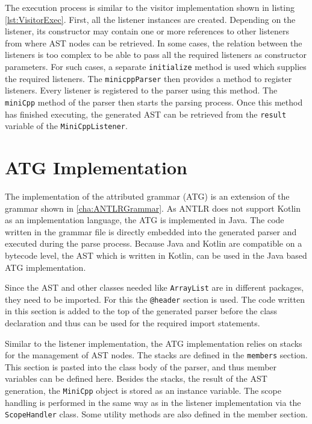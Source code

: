 The execution process is similar to the visitor implementation shown in listing \ref{lst:VisitorExec}. First, all the listener instances are created. Depending on the listener, its constructor may contain one or more references to other listeners from where AST nodes can be retrieved. In some cases, the relation between the listeners is too complex to be able to pass all the required listeners as constructor parameters. For such cases, a separate \verb|initialize| method is used which supplies the required listeners. The \verb|minicppParser| then provides a method to register listeners. Every listener is registered to the parser using this method. The \verb|miniCpp| method of the parser then starts the parsing process. Once this method has finished executing, the generated AST can be retrieved from the \verb|result| variable of the \verb|MiniCppListener|.

\section{ATG Implementation}

The implementation of the attributed grammar (ATG) is an extension of the grammar shown in \ref{cha:ANTLRGrammar}. As ANTLR does not support Kotlin as an implementation language, the ATG is implemented in Java. The code written in the grammar file is directly embedded into the generated parser and executed during the parse process. Because Java and Kotlin are compatible on a bytecode level, the AST which is written in Kotlin, can be used in the Java based ATG implementation. 

Since the AST and other classes needed like \verb|ArrayList| are in different packages, they need to be imported. For this the \verb|@header| section is used. The code written in this section is added to the top of the generated parser before the class declaration and thus can be used for the required import statements. 

Similar to the listener implementation, the ATG implementation relies on stacks for the management of AST nodes. The stacks are defined in the \verb|members| section. This section is pasted into the class body of the parser, and thus member variables can be defined here. Besides the stacks, the result of the AST generation, the \verb|MiniCpp| object is stored as an instance variable. The scope handling is performed in the same way as in the listener implementation via the \verb|ScopeHandler| class. Some utility methods are also defined in the member section. 



